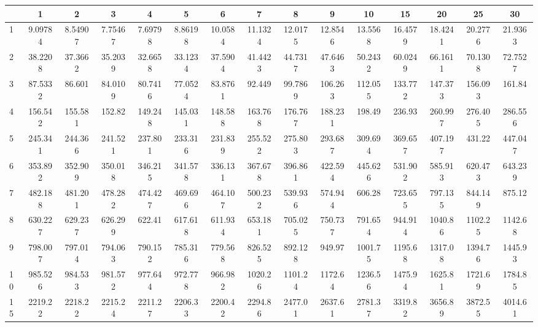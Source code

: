\clearpage
\begin{landscape}
\thispagestyle{empty}
\begin{table}[tb]
        \hspace{-7em}
        \begin{tabular}{|l|c|c|c|c|c|c|c|c|c|c|c|c|c|c|} \hline
           & 1 & 2 & 3 & 4 & 5 & 6 & 7 & 8 & 9 & 10 & 15 & 20 & 25 & 30 \\  \hline
         1 & 9.09784 & 8.54907 & 7.75467 & 7.69798 & 8.86198 & 10.0584 & 11.1324 & 12.0175 & 12.8546 & 13.5568 & 16.4579 & 18.4241 & 20.2776 & 21.9363 \\ \hline
         2 & 38.2208 & 37.3662 & 35.2039 & 32.6658 & 33.1234 & 37.5904 & 41.4423 & 44.7317 & 47.6463 & 50.2432 & 60.0249 & 66.1611 & 70.1308 & 72.7527 \\ \hline
         3 & 87.5332 &  86.601 & 84.0109 & 80.7416 & 77.0524 & 83.8761 &  92.449 & 99.7869 & 106.263 & 112.055 & 133.772 & 147.373 & 156.093 &  161.84 \\ \hline
         4 & 156.542 & 155.581 &  152.82 & 149.248 & 145.031 & 148.588 & 163.768 & 176.767 & 188.231 &  198.49 &  236.93 & 260.997 & 276.405 & 286.556 \\ \hline
         5 & 245.341 & 244.366 & 241.521 & 237.801 & 233.316 & 231.839 & 255.522 & 275.803 & 293.687 & 309.694 & 369.657 & 407.197 &  431.22 & 447.047 \\ \hline
         6 & 353.892 & 352.909 & 350.018 & 346.215 & 341.578 & 336.131 & 367.678 & 396.861 & 422.594 & 445.626 & 531.902 & 585.913 & 620.473 & 643.239 \\ \hline
         7 & 482.188 & 481.201 & 478.282 & 474.427 & 469.696 & 464.107 & 500.232 & 539.936 & 574.944 &  606.28 & 723.655 & 797.135 & 844.149 &  875.12 \\ \hline
         8 & 630.227 & 629.237 & 626.299 &  622.41 & 617.618 & 611.934 & 653.181 & 705.025 & 750.737 & 791.654 & 944.914 & 1040.86 & 1102.25 & 1142.68 \\ \hline
         9 & 798.007 & 797.014 & 794.063 & 790.152 & 785.316 & 779.568 & 826.525 & 892.128 &  949.97 & 1001.75 & 1195.68 & 1317.08 & 1394.76 & 1445.93 \\ \hline
         10 & 985.526 & 984.533 & 981.572 & 977.644 & 972.778 & 966.982 & 1020.26 & 1101.24 & 1172.64 & 1236.56 & 1475.94 & 1625.81 & 1721.69 & 1784.85 \\ \hline
         15 & 2219.22 & 2218.22 & 2215.24 & 2211.27 & 2206.33 & 2200.42 & 2294.86 & 2477.01 & 2637.61 & 2781.37 & 3319.82 & 3656.89 & 3872.55 & 4014.61 \\ \hline

\end{tabular}
\end{table}
\end{landscape}
